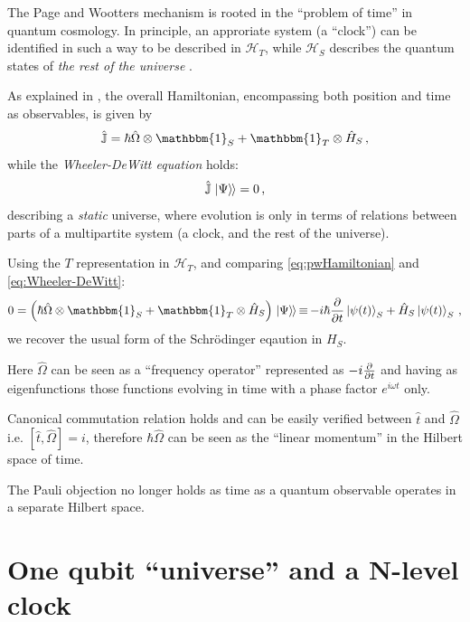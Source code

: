 \documentclass[a0,portrait]{a0poster}
\newcommand{\term}[1]{\emph{#1}}
\newcommand{\idop}{\mathbbm{1}}           %
\newcommand{\hilb}[1]{\mathcal{#1}}       %
\newcommand{\ox}{\otimes}
\DeclareMathOperator*{\repr}{\equiv}      %
\newcommand{\smallback}{\hspace{-0.115em}}
\newcommand{\dket}[1]{\left.\left| #1 \right\rangle\smallback\right\rangle}
\begin{document}
\begin{multicols}{2}
The Page and Wootters mechanism is rooted in the ``problem of time''
in quantum cosmology.
In principle, an approriate system (a ``clock'') can be identified in such a way
to be described in $\mathcal{H}_T$, while $\mathcal{H}_S$ describes
the quantum states of \emph{the rest of the universe} \cite{Marletto:Evolution}.

As explained in \cite{Lloyd:Time, Maccone:Pauli}, the overall Hamiltonian,
encompassing both position and time as observables, is given by
\begin{equation}\label{eq:pwHamiltonian}
  \hat{\mathbb{J}} = \hbar\hat{\Omega}\ox\idop_S + \idop_T\ox\hat{H}_S \,\text{,}
\end{equation}
while the \term{Wheeler-DeWitt equation} holds:
\begin{equation}\label{eq:Wheeler-DeWitt}
  \hat{\mathbb{J}}\dket{\Psi} = 0 \,\text{,}
\end{equation}
describing a \emph{static} universe, where evolution is only
in terms of relations between parts of a multipartite system
(a clock, and the rest of the universe).

Using the $T$ representation in $\hilb{H}_T$,
and comparing \eqref{eq:pwHamiltonian} and \eqref{eq:Wheeler-DeWitt}:
\begin{equation}\label{eq:schrod_from_pw}
  0 = \qty(\hbar\hat{\Omega}\ox\idop_S + \idop_{T}\ox\hat{H}_S)\dket{\Psi}
    \repr -i\hbar\pdv{t}\ket{\psi(t)}_{S} + \hat{H}_S\ket{\psi(t)}_{S}
    \,\text{,}
\end{equation}
we recover the usual form of the Schr\"{o}dinger eqaution in $H_S$.

Here $\hat{\Omega}$ can be seen as a ``frequency operator''
represented as $-i\pdv{t}$ and having as eigenfunctions
those functions evolving in time with a phase factor $e^{i \omega t}$ only.

Canonical commutation relation holds and can be easily verified
between $\hat{t}$ and $\hat{\Omega}$
i.e. $[\hat{t}, \hat{\Omega}] = i$,
therefore $\hbar\hat{\Omega}$ can be seen as the ``linear momentum''
in the Hilbert space of time.

The Pauli objection no longer holds as time as a quantum observable operates in a separate Hilbert space.


\section*{One qubit ``universe'' and a N-level clock}


\end{multicols}
\end{document}
